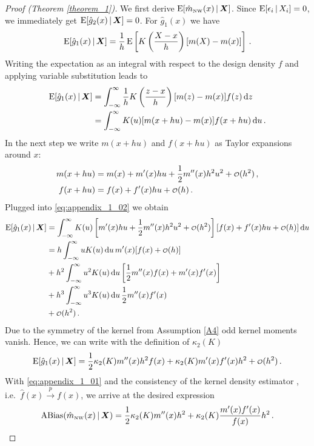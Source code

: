 \begin{proof}[Proof (Theorem \ref{theorem_1})]
	We first derive $\operatorname{E}[\hat{m}_{\textup{\tiny NW}}(x) \,|\, \bm{X}]$.
	Since $\operatorname{E}[\epsilon_i \,|\, X_i] = 0$, we immediately get $\operatorname{E}[\hat{g}_2(x) \,|\, \bm{X}] = 0$.
	For $\hat{g}_1(x)$ we have
	\begin{equation}
		\operatorname{E}[\hat{g}_1(x) \,|\, \bm{X}] = \frac{1}{h} \operatorname{E} \left[ K \left( \frac{X - x}{h}  \right) [m(X) - m(x)] \right] \,.
	\end{equation}
	Writing the expectation as an integral with respect to the design density $f$ and applying variable substitution leads to
	\begin{align}
		\operatorname{E}[\hat{g}_1(x) \,|\, \bm{X}] &= \int_{-\infty}^{\infty} \frac{1}{h} K \left( \frac{z - x}{h} \right) [m(z) - m(x)] f(z) \mathop{}\!\textup{d} z \\
		&= \int_{-\infty}^{\infty} K(u) [m(x + hu) - m(x)] f(x + hu) \mathop{}\!\textup{d} u \,. \label{eq:appendix_1_02}
	\end{align}
	In the next step we write $m(x + hu)$ and $f(x + hu)$ as Taylor expansions around $x$:
	\begin{align}
		m(x + hu) &= m(x) + m'(x)hu + \frac{1}{2} m''(x)h^2u^2 + \operatorname{\scriptstyle \mathcal{O}}(h^2) \,, \\
		f(x + hu) &= f(x) + f'(x)hu + \operatorname{\scriptstyle \mathcal{O}}(h) \,.
	\end{align} 
	Plugged into \eqref{eq:appendix_1_02} we obtain
	\begin{align}
		\operatorname{E}[\hat{g}_1(x) \,|\, \bm{X}] &= \int_{-\infty}^{\infty} K(u) \left[ m'(x)hu + \frac{1}{2} m''(x)h^2u^2 + \operatorname{\scriptstyle \mathcal{O}}(h^2) \right] [f(x) + f'(x)hu + \operatorname{\scriptstyle \mathcal{O}}(h)] \mathop{}\!\textup{d} u \label{eq:appendix_1_03} \\ 
		&= h \int_{-\infty}^{\infty} uK(u) \mathop{}\!\textup{d} u \, m'(x) [f(x) + \operatorname{\scriptstyle \mathcal{O}}(h)] \label{eq:appendix_1_04} \\
		&+ h^2 \int_{-\infty}^{\infty} u^2K(u) \mathop{}\!\textup{d} u \left[ \frac{1}{2} m''(x) f(x) + m'(x) f'(x) \right] \\
		&+ h^3 \int_{-\infty}^{\infty} u^3K(u) \mathop{}\!\textup{d} u \, \frac{1}{2} m''(x) f'(x) \\
		&+ \operatorname{\scriptstyle \mathcal{O}}(h^2) \,.
	\end{align}
	Due to the symmetry of the kernel from Assumption \ref{A4} odd kernel moments vanish. Hence, we can write with the definition of $\kappa_2(K)$ 
	\begin{equation}
		\operatorname{E}[\hat{g}_1(x) \,|\, \bm{X}] = \frac{1}{2} \kappa_2(K) m''(x) h^2 f(x) + \kappa_2(K) m'(x)f'(x) h^2 + \operatorname{\scriptstyle \mathcal{O}}(h^2) \,.
	\end{equation}
	With \eqref{eq:appendix_1_01} and the consistency of the kernel density estimator \parencite{Parzen_1962}, i.e.\ $\hat{f}(x) \overset{p}{\longrightarrow} f(x)$,
	we arrive at the desired expression
	\begin{equation}
		\operatorname{ABias} (\hat{m}_{\textup{\tiny NW}}(x) \,|\, \bm{X}) = \frac{1}{2} \kappa_2(K) m''(x) h^2 + \kappa_2(K) \frac{m'(x)f'(x)}{f(x)} h^2 \,.	
	\end{equation}


\end{proof}
